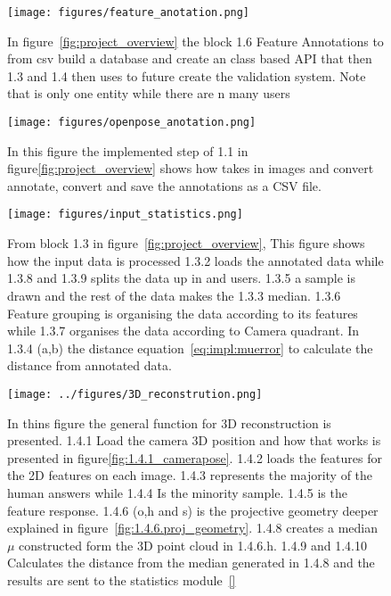 \begin{figure}[ht]
\begin{center}
    \texttt{[image: figures/feature\_anotation.png]}
\end{center}
\caption[1.6 feature anotations]{In figure~\ref{fig:project_overview} the block 1.6 Feature Annotations to from \ac{csv} build a database and create an class based API that then 1.3 and 1.4 then uses to future create the validation system. Note that \openpose{ } is only one entity while there are n many users}
\label{fig:1.6.feature_antotation}
\end{figure}



\begin{figure}[ht]
\begin{center}
    \texttt{[image: figures/openpose\_anotation.png]}
\end{center}
\caption[1.1 OpenPose anotations]{In this figure the implemented step of 1.1 in figure\ref{fig:project_overview} shows how \openpose takes in images and convert annotate, convert and save the annotations as a CSV file.}
\label{fig:1.1.openpose_anotation}
\end{figure}




\begin{figure}[ht]
\begin{center}
    \texttt{[image: figures/input\_statistics.png]}
\end{center}
\caption[1.3 Input statistics]{From block 1.3 in figure~\ref{fig:project_overview}, This figure shows how the input data is processed 1.3.2 loads the annotated data while 1.3.8 and 1.3.9 splits the data up in \openpose and users. 1.3.5 a sample is drawn and the rest of the data makes the 1.3.3 median. 1.3.6 Feature grouping is organising the data according to its features while 1.3.7 organises the data according to Camera quadrant. In 1.3.4 (a,b) the distance equation~\ref{eq:impl:muerror} to calculate the distance from annotated data.}
\label{fig:1.3_input_statistics}
\end{figure}

\begin{figure}[ht]
\begin{center}
    \texttt{[image: ../figures/3D\_reconstrution.png]}
\end{center}
\caption[1.4 3D reconstruction]{In thins figure the general function for 3D reconstruction is presented. 1.4.1 Load the camera 3D position and how that works is presented in figure\ref{fig:1.4.1_camerapose}. 1.4.2 loads the features for the 2D features on each image. 1.4.3 represents the majority of the human answers while 1.4.4 Is the minority sample. 1.4.5 is the \openpose feature response. 1.4.6 (o,h and s) is the projective geometry deeper explained in figure~\ref{fig:1.4.6.proj_geometry}. 1.4.8 creates a median $\mu$ constructed form the 3D point cloud in 1.4.6.h. 1.4.9 and 1.4.10 Calculates the distance from the median generated in 1.4.8 and the results are sent to the statistics module~\ref{} }
\label{fig:1.4.3D_reconstrution}
\end{figure}

